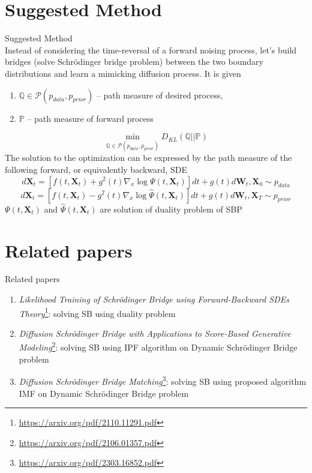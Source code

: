 \documentclass[10pt,pdf,hyperref={unicode}]{beamer}
\begin{document}
\section{Suggested Method}
\begin{frame}{Suggested Method}
~\\[-1mm]
Instead of considering the time-reversal of a forward noising process, let's build bridges (solve Schrödinger bridge problem) between the two boundary distributions and learn a mimicking diffusion process.
It is given
\begin{enumerate}[1.]
    \item $\mathbb{Q} \in \mathcal{P}(p_{data}, p_{prior})$ -- path measure of desired process,
    \item $\mathbb{P}$ -- path measure of forward process
\end{enumerate}

$$\min_{\mathbb{Q} \in \mathcal{P}(p_{data}, p_{prior})}D_{KL}(\mathbb{Q}||\mathbb{P})$$
The solution to the optimization can be expressed by the path measure of the following
forward, or equivalently backward, SDE
$$d\textbf{X}_t = [f(t, \textbf{X}_t) + g^2(t) \nabla_x\log\Psi(t, \textbf{X}_t)]dt+ g(t)d\textbf{W}_t, \textbf{X}_0 \sim p_{data}$$
$$d\textbf{X}_t = [f(t, \textbf{X}_t) - g^2(t) \nabla_x\log\hat\Psi(t, \textbf{X}_t)]dt+ g(t)d\textbf{W}_t, \textbf{X}_T \sim p_{prior}$$
$\Psi(t, \textbf{X}_t)$ and $\hat\Psi(t, \textbf{X}_t)$ are solution of duality problem of SBP
\end{frame}
\section{Related papers}
\begin{frame}{Related papers}
\begin{enumerate}[1.]
    \item \textit{Likelihood Training of Schrödinger Bridge using Forward-Backward SDEs Theory}\footnote{\url{https://arxiv.org/pdf/2110.11291.pdf}}: solving SB using duality problem
    \item \textit{Diffusion Schrödinger Bridge with Applications to Score-Based Generative Modeling}\footnote{\url{https://arxiv.org/pdf/2106.01357.pdf}}: solving SB using IPF algorithm on Dynamic Schrödinger Bridge problem
    \item \textit{Diffusion Schrödinger Bridge Matching}\footnote{\url{https://arxiv.org/pdf/2303.16852.pdf}}: solving SB using proposed algorithm IMF on Dynamic Schrödinger Bridge problem
\end{enumerate}
\end{frame}
\end{document}
